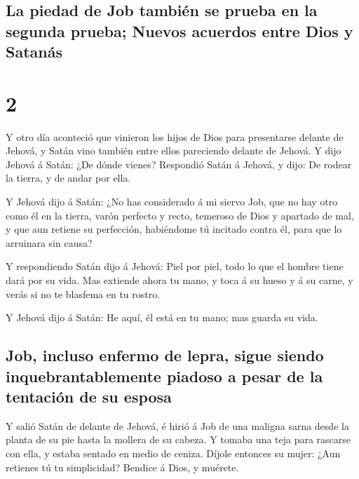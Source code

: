 \hypertarget{la-piedad-de-job-tambiuxe9n-se-prueba-en-la-segunda-prueba-nuevos-acuerdos-entre-dios-y-satanuxe1s}{%
\subsection{La piedad de Job también se prueba en la segunda prueba;
Nuevos acuerdos entre Dios y
Satanás}\label{la-piedad-de-job-tambiuxe9n-se-prueba-en-la-segunda-prueba-nuevos-acuerdos-entre-dios-y-satanuxe1s}}

\hypertarget{section-1}{%
\section{2}\label{section-1}}

 Y otro día aconteció que vinieron los hijos de Dios para
presentarse delante de Jehová, y Satán vino también entre ellos
pareciendo delante de Jehová.  Y dijo Jehová á Satán: ¿De
dónde vienes? Respondió Satán á Jehová, y dijo: De rodear la tierra, y
de andar por ella.

 Y Jehová dijo á Satán: ¿No has considerado á mi siervo
Job, que no hay otro como él en la tierra, varón perfecto y recto,
temeroso de Dios y apartado de mal, y que aun retiene su perfección,
habiéndome tú incitado contra él, para que lo arruinara sin causa?

 Y respondiendo Satán dijo á Jehová: Piel por piel, todo
lo que el hombre tiene dará por su vida.  Mas extiende
ahora tu mano, y toca á su hueso y á su carne, y verás si no te blasfema
en tu rostro.

 Y Jehová dijo á Satán: He aquí, él está en tu mano; mas
guarda su vida.

\hypertarget{job-incluso-enfermo-de-lepra-sigue-siendo-inquebrantablemente-piadoso-a-pesar-de-la-tentaciuxf3n-de-su-esposa}{%
\subsection{Job, incluso enfermo de lepra, sigue siendo
inquebrantablemente piadoso a pesar de la tentación de su
esposa}\label{job-incluso-enfermo-de-lepra-sigue-siendo-inquebrantablemente-piadoso-a-pesar-de-la-tentaciuxf3n-de-su-esposa}}

 Y salió Satán de delante de Jehová, é hirió á Job de una
maligna sarna desde la planta de su pie hasta la mollera de su cabeza.
 Y tomaba una teja para rascarse con ella, y estaba
sentado en medio de ceniza.  Díjole entonces su mujer:
¿Aun retienes tú tu simplicidad? Bendice á Dios, y muérete.

